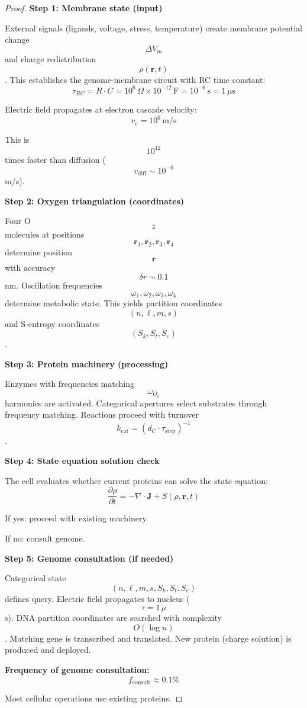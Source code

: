 \documentclass[12pt,a4paper]{article}
\begin{document}
\begin{proof}
\textbf{Step 1: Membrane state (input)}

External signals (ligands, voltage, stress, temperature) create membrane potential change $$\Delta V_m$$ and charge redistribution $$\rho(\mathbf{r}, t)$$. This establishes the genome-membrane circuit with RC time constant:
$$
\tau_{RC} = R \cdot C = 10^6 \, \Omega \times 10^{-12} \, \text{F} = 10^{-6} \, \text{s} = 1 \, \mu\text{s}
$$

Electric field propagates at electron cascade velocity:
$$
v_e = 10^6 \, \text{m/s}
$$

This is $$10^{12}$$ times faster than diffusion ($$v_{\text{diff}} \sim 10^{-6}$$ m/s).

\textbf{Step 2: Oxygen triangulation (coordinates)}

Four O$$_2$$ molecules at positions $$\mathbf{r}_1, \mathbf{r}_2, \mathbf{r}_3, \mathbf{r}_4$$ determine position $$\mathbf{r}$$ with accuracy $$\delta r \sim 0.1$$ nm. Oscillation frequencies $$\omega_1, \omega_2, \omega_3, \omega_4$$ determine metabolic state. This yields partition coordinates $$(n, \ell, m, s)$$ and S-entropy coordinates $$(S_k, S_t, S_e)$$.

\textbf{Step 3: Protein machinery (processing)}

Enzymes with frequencies matching $$\omega_{O_2}$$ harmonics are activated. Categorical apertures select substrates through frequency matching. Reactions proceed with turnover $$k_{\text{cat}} = (d_C \cdot \tau_{\text{step}})^{-1}$$.

\textbf{Step 4: State equation solution check}

The cell evaluates whether current proteins can solve the state equation:
$$
\frac{\partial \rho}{\partial t} = -\nabla \cdot \mathbf{J} + S(\rho, \mathbf{r}, t)
$$

If yes: proceed with existing machinery.

If no: consult genome.

\textbf{Step 5: Genome consultation (if needed)}

Categorical state $$(n, \ell, m, s, S_k, S_t, S_e)$$ defines query. Electric field propagates to nucleus ($$\tau = 1 \, \mu$$s). DNA partition coordinates are searched with complexity $$O(\log n)$$. Matching gene is transcribed and translated. New protein (charge solution) is produced and deployed.

\textbf{Frequency of genome consultation:}
$$
f_{\text{consult}} \approx 0.1\%
$$

Most cellular operations use existing proteins.
\end{proof}
\end{document}
